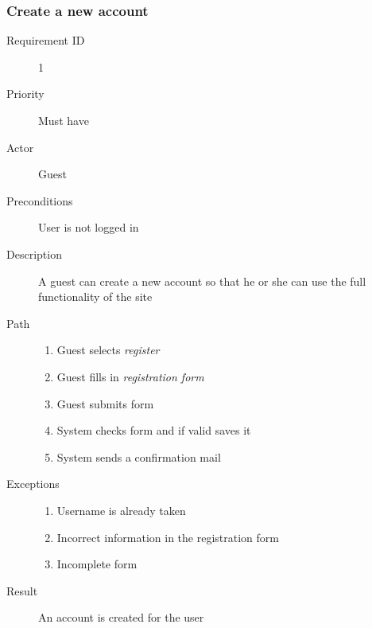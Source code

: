 		\subsubsection{Create a new account} 
			\begin{description}
				\item[Requirement ID] 1
				\item[Priority] Must have
				\item[Actor] Guest
				\item[Preconditions] User is not logged in
				\item[Description]
				A guest can create a new account so that he or she 
				can use the full functionality of the site
 				\item[Path]
 					\begin{enumerate}
						\item Guest selects \emph{register}
						\item Guest fills in \emph{registration form}
						\item Guest submits form
						\item System checks form and if valid saves it
						\item System sends a confirmation mail 
					\end{enumerate}
				\item[Exceptions]
					\begin{enumerate}
						\item Username is already taken
						\item Incorrect information in the registration form
						\item Incomplete form
					\end{enumerate}
				\item[Result] An account is created for the user
			\end{description}
